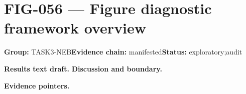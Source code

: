 \clearpage
\section{FIG-056 --- Figure diagnostic framework overview}
\label{figpage:fig-056}
\textbf{Group:} TASK3-NEB\quad \textbf{Evidence chain:} manifested\quad \textbf{Status:} exploratory;audit

\textbf{Results text draft.} 
\textbf{Discussion and boundary.} 


\textbf{Evidence pointers.}



\vfill
